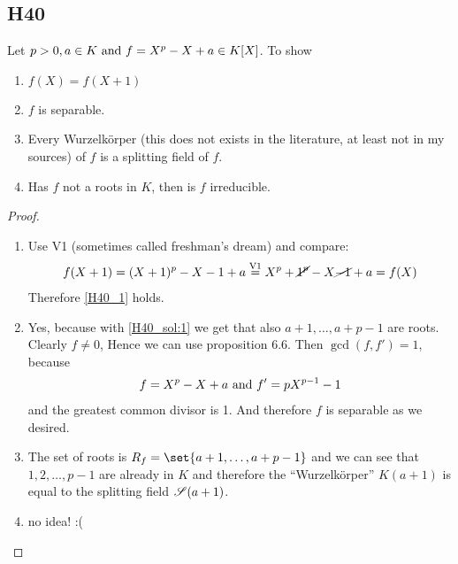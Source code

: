 \subsection{H40}
Let $p > 0, a \in K \text{ and } f = X^p - X + a \in K[X]$. To show
\begin{enumerate}
	\item $f(X) = f(X+1)$ \label{H40_1}
	\item $f$ is separable.
	\item Every Wurzelkörper (this does not exists in the literature, at least not in my sources) of $f$ is a splitting field of $f$.
	\item Has $f$ not a roots in $K$, then is $f$ irreducible. 
\end{enumerate}
\begin{proof}\
	\begin{enumerate}
		\item Use V1 (sometimes called freshman's dream) and compare: \label{H40_sol:1}
		\begin{align*}
			f(X+1) = (X+1)^p - X -1 + a \overset{\text{V1}}{=} X^p + \cancel{1^p} -X \cancel{-1} +a = f(X) 
		\end{align*}
		Therefore \ref{H40_1} holds.
		\item Yes, because with \ref{H40_sol:1} we get that also $a +1, \dots, a+ p-1$ are roots.
		Clearly $f \neq 0$, Hence we can use proposition 6.6. Then $\gcd(f,f') =1$, because
		\begin{align*}
			f = X^p - X +a \text{ and } f' = pX^{p-1} -1
		\end{align*}
		and the greatest common divisor is 1. And therefore $f$ is separable as we desired.
		\item The set of roots is $R_f = \set{a+1, \dots, a+p-1}$ and we can see that $1,2, \dots, p-1$ are already in $K$ and therefore the ``Wurzelkörper'' $K(a+1)$ is equal to the splitting field $\mathscr S(a+1)$.
		\item no idea! :( 
	\end{enumerate}
\end{proof}